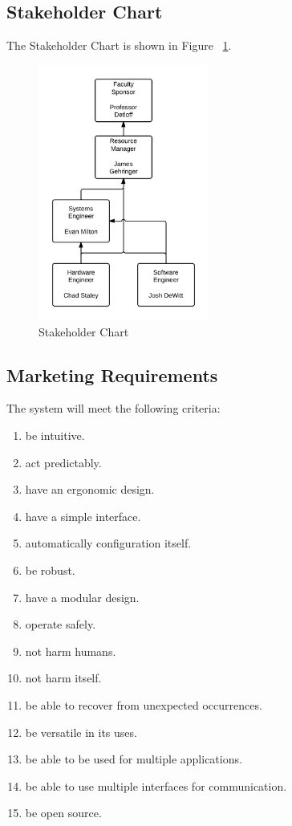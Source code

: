 \documentclass[11pt]{report}
\begin{document}
\subsection{Stakeholder Chart}
The Stakeholder Chart is shown in Figure ~\ref{fig:stakeholderchart}.
\begin{figure}[h]
	\centering
	\includegraphics[width=0.5\textwidth]{organization.png}
	\caption{Stakeholder Chart}
	\label{fig:stakeholderchart}
\end{figure}

\subsection{Marketing Requirements}
The system will meet the following criteria:
\begin{enumerate} \parskip2pt
	\item be intuitive.
	\item act predictably.
	\item have an ergonomic design.
	\item have a simple interface.
	\item automatically configuration itself.
	\item be robust.
	\item have a modular design.
	\item operate safely.
	\item not harm humans.
	\item not harm itself.
	\item be able to recover from unexpected occurrences.
	\item be versatile in its uses.
	\item be able to be used for multiple applications.
	\item be able to use multiple interfaces for communication.
	\item be open source.
\end{enumerate}
\end{document}
